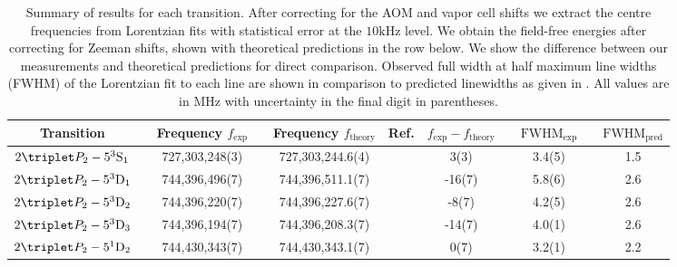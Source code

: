 \begin{table}[t]
\caption{Summary of results for each transition. After correcting for the AOM and vapor cell shifts we extract the centre frequencies from Lorentzian fits with statistical error at the $10\textrm{kHz}$ level. We obtain the field-free energies after correcting for Zeeman shifts, shown with theoretical predictions in the row below. We show the difference between our measurements and theoretical predictions for direct comparison. Observed full width at half maximum line widths (FWHM) of the Lorentzian fit to each line are shown in comparison to predicted linewidths as given in \cite{Drake07}. All values are in MHz with uncertainty in the final digit in parentheses.}
        \begin{tabular}{c c c c c c c c c c c}
      \hline\hline
      Transition                        & &  Frequency $f_\textrm{exp}$ & &  Frequency $f_\textrm{theory}$ & Ref. &  $f_\textrm{exp}-f_\textrm{theory}$      & &  $\textrm{FWHM}_{\textrm{exp}}$  & &  $\textrm{FWHM}_{{\textrm{pred}}}$ \\
      \hline
        $2\triplet P_2 - 5^3\mathrm{S}_1$ & &  {727,303,248(3)} & &  727,303,244.6(4)   & \cite{Drake07} &  {3(3)}    & &  3.4(5)  & &  1.5\\ %
        $2\triplet P_2 - 5^3\mathrm{D}_1$ & &  {744,396,496(7)} & &  744,396,511.1(7)   & \cite{Yerokhin20} &  {-16(7)}    & &  5.8(6)  & &  2.6\\
        $2\triplet P_2 - 5^3\mathrm{D}_2$ & &  {744,396,220(7)} & &  744,396,227.6(7)   & \cite{Yerokhin20} &  {-8(7)}    & &  4.2(5)  & &  2.6\\
        $2\triplet P_2 - 5^3\mathrm{D}_3$ & &  {744,396,194(7)} & &  744,396,208.3(7)   & \cite{Yerokhin20} &  {-14(7)}    & &  4.0(1)  & &  2.6\\
        $2\triplet P_2 - 5^1\mathrm{D}_2$ & &  {744,430,343(7)} & &  744,430,343.1(7)   & \cite{Yerokhin20} &  {0(7)}    & &  3.2(1)  & &  2.2\\  %
      \hline\hline
    \end{tabular}
  
  \label{tab:results}
\end{table}
